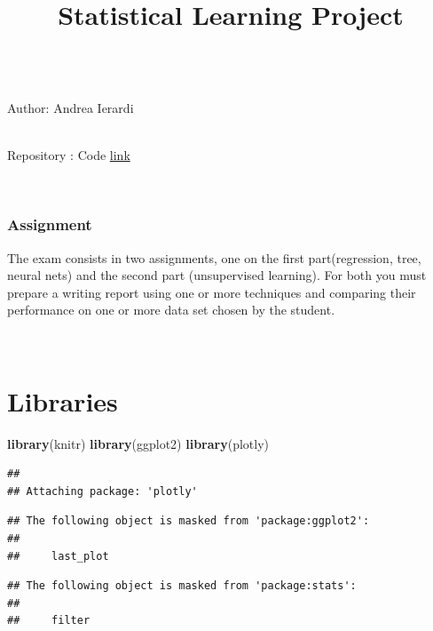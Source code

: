 \documentclass[
]{article}
\title{Statistical Learning Project}
\author{}
\date{\vspace{-2.5em}}
\newenvironment{Shaded}{\begin{snugshade}}{\end{snugshade}}
\newcommand{\KeywordTok}[1]{\textcolor[rgb]{0.13,0.29,0.53}{\textbf{#1}}}
\newcommand{\NormalTok}[1]{#1}
\begin{document}
\maketitle

{
\setcounter{tocdepth}{2}
\tableofcontents
}
~\\

Author: Andrea Ierardi

~\\

Repository : Code
\href{https://github.com/Andreaierardi/Statistical-Learning-Project}{link}

~\\

\hypertarget{assignment}{%
\subsubsection{Assignment}\label{assignment}}

The exam consists in two assignments, one on the first part(regression,
tree, neural nets) and the second part (unsupervised learning). For both
you must prepare a writing report using one or more techniques and
comparing their performance on one or more data set chosen by the
student.

~\\

\hypertarget{libraries}{%
\section{Libraries}\label{libraries}}

\begin{Shaded}
\begin{Highlighting}[]
\KeywordTok{library}\NormalTok{(knitr)}
\KeywordTok{library}\NormalTok{(ggplot2)}
\KeywordTok{library}\NormalTok{(plotly)}
\end{Highlighting}
\end{Shaded}

\begin{verbatim}
## 
## Attaching package: 'plotly'
\end{verbatim}

\begin{verbatim}
## The following object is masked from 'package:ggplot2':
## 
##     last_plot
\end{verbatim}

\begin{verbatim}
## The following object is masked from 'package:stats':
## 
##     filter
\end{verbatim}
\end{document}
